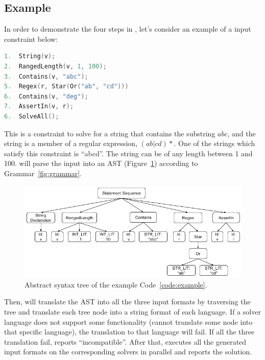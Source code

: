 \subsection{Example}

In order to demonstrate the four steps in \imss, let's consider an example of a input constraint
below:
\renewcommand\lstlistingname{Code}
\begin{lstlisting}[label={code:example},frame=bt,numbers=none,basicstyle=\ttfamily\scriptsize,
language=C,captionpos=b,caption={Input constraint in \imss format}]
1.  String(v);
2.  RangedLength(v, 1, 100);
3.  Contains(v, "abc");
5.  Regex(r, Star(Or("ab", "cd")))
6.  Contains(v, "deg");
7.  AssertIn(v, r);
6.  SolveAll();
\end{lstlisting}
This is a constraint to solve for a string that contains the substring $abc$, and
the string is a member of a regular expression, $(ab|cd)*$.
One of the strings which satisfy this constraint is ``abcd''. The string can be of any length
between 1 and 100. \imss will parse the input into an AST (Figure~\ref{fig:exp-ast}) according to Grammar~\ref{fig:grammar}.

\begin{figure}
    \centering
    \includegraphics[scale=0.65]{example-ast}
    \caption{\label{fig:exp-ast}Abstract syntax tree of the example Code~\ref{code:example}.}
\end{figure}

Then, \imss will translate the AST into all the three input formats by traversing the tree and
translate each tree node into a string format of each language. If a solver language does not support
some functionality (\imss cannot translate some node into that specific language),
the translation to that language will fail. If all the three translation fail, \imss
reports ``incompatible''. After that, \imss executes all the generated input formats on the
corresponding solvers in parallel and reports the solution.
